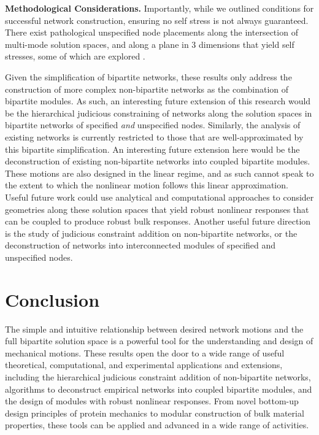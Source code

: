 \documentclass[%
preprint,
 amsmath,amssymb,
 aps,
]{revtex4-1}
\begin{document}
\noindent \textbf{Methodological Considerations.} Importantly, while we outlined conditions for successful network construction, ensuring no self stress is not always guaranteed. There exist pathological unspecified node placements along the intersection of multi-mode solution spaces, and along a plane in 3 dimensions that yield self stresses, some of which are explored \cite{whiteley1984}. 

Given the simplification of bipartite networks, these results only address the construction of more complex non-bipartite networks as the combination of bipartite modules. As such, an interesting future extension of this research would be the hierarchical judicious constraining of networks along the solution spaces in bipartite networks of specified \emph{and} unspecified nodes. Similarly, the analysis of existing networks is currently restricted to those that are well-approximated by this bipartite simplification. An interesting future extension here would be the deconstruction of existing non-bipartite networks into coupled bipartite modules. These motions are also designed in the linear regime, and as such cannot speak to the extent to which the nonlinear motion follows this linear approximation. Useful future work could use analytical and computational approaches to consider geometries along these solution spaces that yield robust nonlinear responses that can be coupled to produce robust bulk responses. Another useful future direction is the study of judicious constraint addition on non-bipartite networks, or the deconstruction of networks into interconnected modules of specified and unspecified nodes.


\section{Conclusion}
The simple and intuitive relationship between desired network motions and the full bipartite solution space is a powerful tool for the understanding and design of mechanical motions. These results open the door to a wide range of useful theoretical, computational, and experimental applications and extensions, including the hierarchical judicious constraint addition of non-bipartite networks, algorithms to deconstruct empirical networks into coupled bipartite modules, and the design of modules with robust nonlinear responses. From novel bottom-up design principles of protein mechanics to modular construction of bulk material properties, these tools can be applied and advanced in a wide range of activities. 
\end{document}
